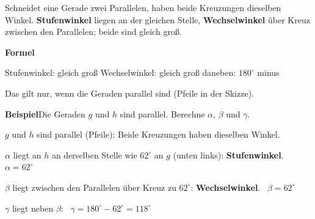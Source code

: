 \documentclass[11pt]{article}
\makeatletter
\newlength{\kr}
\newcommand{\karomerk}[2]{\protected@write\@auxout{}{\string\karoseite{#1}{#2}{\thepage}}}
\newcommand{\karoseite}[3]{\expandafter\xdef\csname karo@#1@#2\endcsname{#3}}
\makeatother
\begin{document}
\medskip
\par\vspace{3mm}\setlength{\kr}{\dimexpr\pagegoal-\pagetotal-10mm\relax}%
\ifdim\kr>12mm\karomerk{k}{B}\noindent{\scriptsize\color{mbgrau}Platz zum Rechnen}\par\nointerlineskip\vspace{1mm}\noindent
\begin{tikzpicture}\clip (0,0) rectangle ({\linewidth-0.5mm},\kr);\draw[black!16,line width=0.3pt,step=5mm] (0,0) grid (\linewidth,\kr);\end{tikzpicture}\fi\par
\clearpage\label{s:C}\noindent\colorbox{black!12}{}\hspace{3mm}{\Large\bfseries Winkel an Parallelen}\par\smallskip
\noindent Schneidet eine Gerade zwei Parallelen, haben beide Kreuzungen dieselben Winkel. \textbf{Stufenwinkel} liegen an der gleichen Stelle, \textbf{Wechselwinkel} über Kreuz zwischen den Parallelen; beide sind gleich groß.\par\medskip
\noindent\textbf{Formel}\par\nopagebreak\noindent\hspace*{4mm}\begin{minipage}{\dimexpr\linewidth-4mm\relax}Stufenwinkel: gleich groß \qquad Wechselwinkel: gleich groß \qquad daneben: $180^\circ$ minus\par {\small Das gilt nur, wenn die Geraden parallel sind (Pfeile in der Skizze).}\end{minipage}\par\medskip
\noindent\textbf{Beispiel}\quad Die Geraden $g$ und $h$ sind parallel. Berechne $\alpha$, $\beta$ und $\gamma$.\par\smallskip
\noindent\begin{minipage}[t]{0.6\linewidth}\vspace{0pt}\par\noindent{}$g$ und $h$ sind parallel (Pfeile): Beide Kreuzungen haben dieselben Winkel.\par\smallskip\par\noindent{}$\alpha$ liegt an $h$ an derselben Stelle wie $62^\circ$ an $g$ (unten links): \textbf{Stufenwinkel}. \ $\alpha = 62^\circ$\par\smallskip\par\noindent{}$\beta$ liegt zwischen den Parallelen über Kreuz zu $62^\circ$: \textbf{Wechselwinkel}. \ $\beta = 62^\circ$\par\smallskip\par\noindent{}$\gamma$ liegt neben $\beta$: \ $\gamma = 180^\circ - 62^\circ = 118^\circ$\par\smallskip\end{minipage}\hfill
\end{document}
